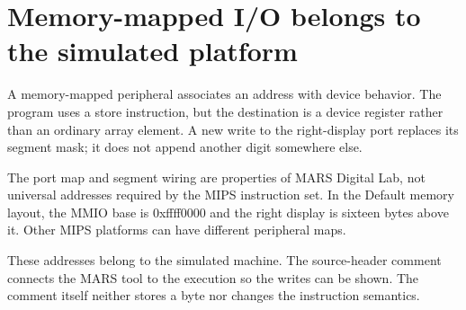 \section{Memory-mapped I/O belongs to the simulated
  platform}\label{005-seven-segment-counter-p01-memory-mapped-io-belongs-to-the-simulated-platform}

A memory-mapped peripheral associates an address with device behavior.
The program uses a store instruction, but the destination is a device
register rather than an ordinary array element. A new write to the
right-display port replaces its segment mask; it does not append another
digit somewhere else.

The port map and segment wiring are properties of MARS Digital Lab, not
universal addresses required by the MIPS instruction set. In the Default
memory layout, the MMIO base is 0xffff0000 and the right display is
sixteen bytes above it. Other MIPS platforms can have different
peripheral maps.

These addresses belong to the simulated machine. The source-header
comment connects the MARS tool to the execution so the writes can be
shown. The comment itself neither stores a byte nor changes the
instruction semantics.
